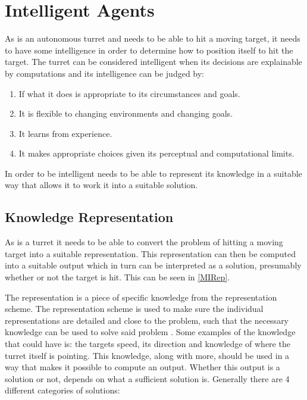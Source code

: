 \section{Intelligent Agents}
 
As \namep is an autonomous turret and needs to be able to hit a moving target,
it needs to have some intelligence in order to determine how to position itself
to hit the target. The turret can be considered intelligent
\citep[ch.1.1]{MIBook} when its decisions are explainable by computations and
its intelligence can be judged by:

\begin{enumerate}
  \item If what it does is appropriate to its circumstances and goals.
  \item It is flexible to changing environments and changing goals.
  \item It learns from experience.
  \item It makes appropriate choices given its perceptual and computational
  limits.
\end{enumerate}

In order to be intelligent \name needs to be able to represent its knowledge in
a suitable way that allows it to work it into a suitable solution. 

\subsection{Knowledge Representation}\label{KR}

As \name is a turret it needs to be able to convert the problem of hitting a
moving target into a suitable representation. This representation can then be
computed into a suitable output which in turn can be interpreted as
a solution, presumably whether or not the target is hit. This can be seen in
\autoref{MIRep}.


The representation is a piece of specific knowledge from the representation
scheme. The representation scheme is used to make sure the individual
representations are detailed and close to the problem, such that the necessary
knowledge can be used to solve said problem \citep{MIBook}. Some examples of the
knowledge that \name could have is: the targets speed, its direction and
knowledge of where the turret itself is pointing. This knowledge, along with
more, should be used in a way that makes it possible to compute an output.
Whether this output is a solution or not, depends on what a sufficient solution
is. Generally there are 4 different categories of solutions:

